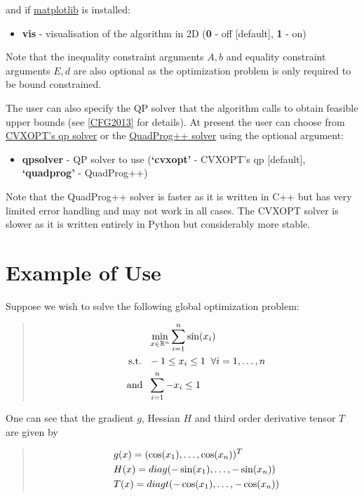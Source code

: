 \documentclass[letterpaper,11pt,openany,oneside]{sphinxmanual}
\begin{document}
and if \href{http://www.matplotlib.org/}{matplotlib} is installed:
\begin{itemize}
\item {} 
\textbf{vis} - visualisation of the algorithm in 2D (\textbf{0} - off {[}default{]}, \textbf{1} - on)

\end{itemize}

Note that the inequality constraint arguments $A, b$ and  equality constraint arguments $E, d$ are also optional as the optimization problem is only required to be bound constrained.

The user can also specify the QP solver that the algorithm calls to obtain feasible upper bounds (see {\hyperref[userguide:cfg2013]{{[}CFG2013{]}}} for details). At present the user can choose from \href{http://cvxopt.org/}{CVXOPT's qp solver} or the \href{http://github.com/mpy/PyQuadProg/}{QuadProg++ solver} using the optional argument:
\begin{itemize}
\item {} 
\textbf{qpsolver} - QP solver to use (\textbf{`cvxopt'} - CVXOPT's qp {[}default{]}, \textbf{`quadprog'} - QuadProg++)

\end{itemize}

Note that the QuadProg++ solver is faster as it is written in C++ but has very limited error handling and may not work in all cases. The CVXOPT solver is slower as it is written entirely in Python but considerably more stable.


\section{Example of Use}
\label{userguide:example-of-use}
Suppose we wish to solve the following global optimization problem:
\begin{quote}
\begin{gather}
\begin{split}&\min_{x \in \mathbb{R}^n} \sum_{i=1}^n \sin(x_i) \\
\text{s.t. } \; &-1 \le x_i \le 1 \; \; \forall i=1,\dotsc,n \\
\text{and }  \; &\sum_{i=1}^n -x_i \le 1\end{split}\notag
\end{gather}\end{quote}

One can see that the gradient $g$, Hessian $H$ and third order derivative tensor $T$ are given by
\begin{quote}
\begin{gather}
\begin{split}&g(x) = ( \cos(x_1), \dotsc, \cos(x_n))^T \\
&H(x) = diag( -\sin(x_1), \dotsc, -\sin(x_n)) \\
&T(x) = diagt( -\cos(x_1), \dotsc, -\cos(x_n))\end{split}\notag
\end{gather}\end{quote}
\end{document}
